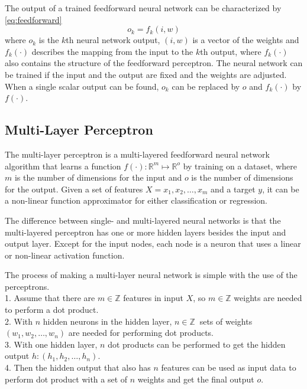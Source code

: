 \noindent The output of a trained feedforward neural network can be characterized by \eqref{eq:feedforward}
\begin{equation} o_k = f_k(i,w) \label{eq:feedforward} \end{equation}
where $o_k$ is the $k$th neural network output, $(i,w)$ is a vector of the weights and $f_k(\cdot)$ describes the mapping from the input to the $k$th output, where $f_k(\cdot)$ also contains the structure of the feedforward perceptron. The neural network can be trained if the input and the output are fixed and the weights are adjusted. When a single scalar output can be found, $o_k$ can be replaced by $o$ and $f_k(\cdot)$ by $f(\cdot)$.



\subsection{Multi-Layer Perceptron}

The multi-layer perceptron is a multi-layered feedforward neural network algorithm that learns a function $f(\cdot) : \mathbb{R}^m \mapsto \mathbb{R}^o$ by training on a dataset, where $m$ is the number of dimensions for the input and $o$ is the number of dimensions for the output. Given a set of features $X = x_1, x_2, \dots, x_m$ and a target $y$, it can be a non-linear function approximator for either classification or regression. \medskip

The difference between single- and multi-layered neural networks is that the multi-layered perceptron has one or more hidden layers besides the input and output layer. Except for the input nodes, each node is a neuron that uses a linear or non-linear activation function. \medskip

The process of making a multi-layer neural network is simple with the use of the perceptrons.\\
1. Assume that there are $m\in\mathbb{Z}$ features in input $X$, so $m\in\mathbb{Z}$ weights are needed to perform a dot product.\\
2. With $n$ hidden neurons in the hidden layer, $n\in\mathbb{Z}~$ sets of weights $(w_1, w_2, \dots , w_n)$ are needed for performing dot products.\\
3. With one hidden layer, $n$ dot products can be performed to get the hidden output $h: (h_1, h_2, \dots , h_n).$\\
4. Then the hidden output that also has $n$ features can be used as input data to perform dot product with a set of $n$ weights and get the final output $o$. \bigskip


